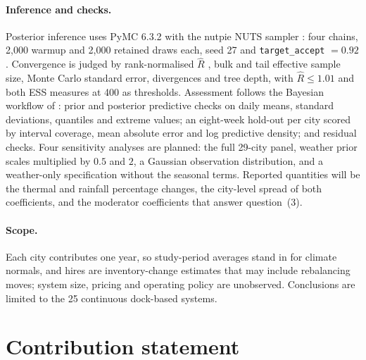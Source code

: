 \documentclass{article}
\begin{document}
\paragraph{Inference and checks.} Posterior inference uses PyMC 6.3.2
\citep{abrilpla2023pymc} with the nutpie NUTS sampler \citep{nutpie}: four chains,
2{,}000 warmup and 2{,}000 retained draws each, seed 27 and
\texttt{target\_accept} $=0.92$. Convergence is judged by rank-normalised
$\widehat{R}$ \citep{vehtari2021rank}, bulk and tail effective sample size, Monte
Carlo standard error, divergences and tree depth, with $\widehat{R}\le1.01$ and
both ESS measures at 400 as thresholds. Assessment follows the Bayesian workflow
of \citet{gabry2019visualization}: prior and posterior predictive checks on daily
means, standard deviations, quantiles and extreme values; an eight-week hold-out
per city scored by interval coverage, mean absolute error and log predictive
density; and residual checks. Four sensitivity analyses are
planned: the full 29-city panel, weather prior scales multiplied by $0.5$ and $2$,
a Gaussian observation distribution, and a weather-only specification without the
seasonal terms. Reported quantities will be the thermal
and rainfall percentage changes, the city-level spread of both coefficients, and
the moderator coefficients that answer question~(3).

\paragraph{Scope.} Each city contributes one year, so study-period averages stand
in for climate normals, and hires are inventory-change estimates that may include
rebalancing moves; system size, pricing and operating policy are unobserved.
Conclusions are limited to the 25 continuous dock-based systems.

\section*{Contribution statement}

\leavevmode\par

\small


\end{document}
